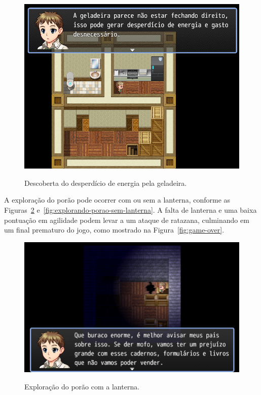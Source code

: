 \begin{figure}[!htbp]
	\centering
	\caption{Descoberta do desperdício de energia pela geladeira.}
	\includegraphics[scale=0.45]{Textuais/Pictures/desperdicio-geladeira.png}
	\label{fig:desperdicio-geladeira}
\end{figure}

A exploração do porão pode ocorrer com ou sem a lanterna, conforme as Figuras~\ref{fig:explorando-porao-com-lanterna} e~\ref{fig:explorando-porao-sem-lanterna}. A falta de lanterna e uma baixa pontuação em agilidade podem levar a um ataque de ratazana, culminando em um final prematuro do jogo, como mostrado na Figura~\ref{fig:game-over}.

\begin{figure}[!htbp]
	\centering
	\caption{Exploração do porão com a lanterna.}
	\includegraphics[scale=0.55]{Textuais/Pictures/explorando-porao-com-lanterna.png}
	\label{fig:explorando-porao-com-lanterna}
\end{figure}

